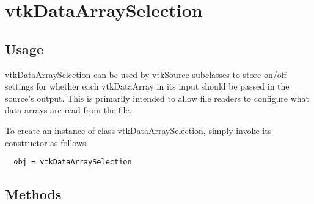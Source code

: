 \section{vtkDataArraySelection}

\subsection{Usage}

 vtkDataArraySelection can be used by vtkSource subclasses to store
 on/off settings for whether each vtkDataArray in its input should
 be passed in the source's output.  This is primarily intended to
 allow file readers to configure what data arrays are read from the
 file.

To create an instance of class vtkDataArraySelection, simply
invoke its constructor as follows
\begin{verbatim}
  obj = vtkDataArraySelection
\end{verbatim}
\subsection{Methods}

